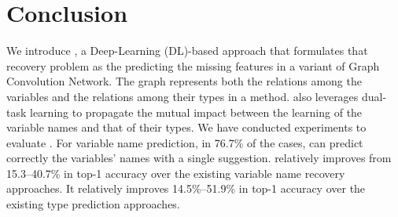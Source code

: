 \section{Conclusion}
\label{sec:conclusion}

We introduce {\tool}, a Deep-Learning (DL)-based approach that
formulates that recovery problem as the predicting the missing
features in a variant of Graph Convolution Network. The graph
represents both the relations among the variables and the relations
among their types in a method. {\tool} also leverages
dual-task learning to propagate the mutual impact between the learning
of the variable names and that of their types. We have conducted
experiments to evaluate {\tool}.
For variable name prediction, in 76.7\% of the cases, {\tool} can
predict correctly the variables' names with a single
suggestion. {\tool} relatively improves from 15.3--40.7\% in top-1
accuracy over the existing variable name recovery approaches.
It relatively improves 14.5\%--51.9\% in top-1 accuracy over the
existing type prediction approaches.
